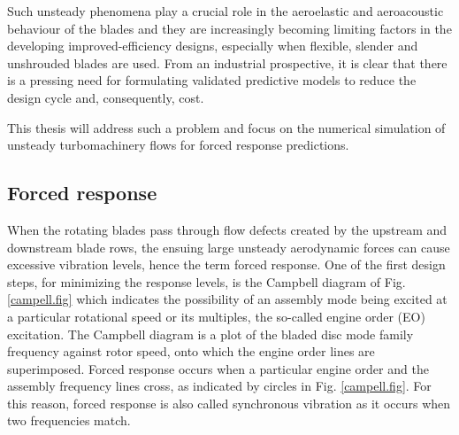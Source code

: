  Such unsteady phenomena play a crucial role in the aeroelastic and
 aeroacoustic behaviour of the blades and they are increasingly becoming
 limiting factors in the developing improved-efficiency designs,
 especially when flexible, slender and unshrouded blades are used.
 From an industrial prospective, it is clear that there is a pressing
 need for formulating validated predictive
 models to reduce the design cycle and, consequently, cost.

 This thesis will address such a problem and focus on the numerical
 simulation of unsteady turbomachinery flows for forced response
 predictions.
%
%
%
%
\subsection{Forced response}
%
 When the rotating blades pass through flow defects created by the
 upstream and downstream blade rows, the ensuing large unsteady
 aerodynamic forces can cause excessive vibration levels, hence the term
 forced response. One of the first design steps, for minimizing the response
 levels, is the Campbell diagram of Fig. \ref{campell.fig} which
 indicates the possibility of an assembly mode being excited
 at a particular rotational speed or its multiples, the so-called
 engine order (EO) excitation.
 The Campbell diagram is a plot of the bladed disc mode family frequency
 against rotor speed, onto which the engine order lines are superimposed.
 Forced response occurs when a particular engine order and the assembly
 frequency lines cross, as indicated by circles in Fig. \ref{campell.fig}.
 For this reason, forced response is also called synchronous vibration as it
 occurs when two frequencies match.

